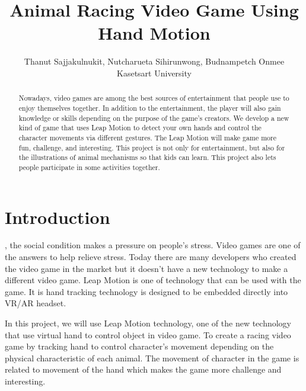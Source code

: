\documentclass[journal]{IEEEtran}										    %
\title{\textbf{Animal Racing Video Game Using Hand Motion}}
\author{Thanut Sajjakulnukit, Nutcharueta Sihirunwong, Budnampetch Onmee \\
    \Large Kasetsart University }
\begin{document}
    \maketitle
    
    \begin{abstract}                                                        %
        Nowadays, video games are among the best sources of entertainment 
        that people use to enjoy themselves together. In addition to the 
        entertainment, the player will also gain knowledge or skills 
        depending on the purpose of the game’s creators. We  develop a new 
        kind of game that uses Leap Motion to detect your own hands and 
        control the character movements via different gestures. 
        The Leap Motion will make game more fun, challenge, and interesting. 
        This project is not only for entertainment, but also for the 
        illustrations of animal mechanisms so that kids can learn. 
        This project also lets people participate in some activities together.

    \end{abstract}

    \section{Introduction}                                                  %
        , the social condition makes a pressure 
        on people’s stress. Video games are one of the answers to help relieve 
        stress. Today there are many developers who created the video 
        game in the market but it doesn't have a new technology to make 
        a different video game. Leap Motion is one of technology that 
        can be used with the game. It is hand tracking technology is 
        designed to be embedded directly into VR/AR headset. 

        In this project, we will use Leap Motion technology, one of
        the new technology that use virtual hand to control object
        in video game. To create a racing video game by tracking 
        hand to control character’s movement depending on the 
        physical characteristic of each animal. The movement of 
        character in the game is related to movement of the hand 
        which makes the game more challenge and interesting.
        
\end{document}
